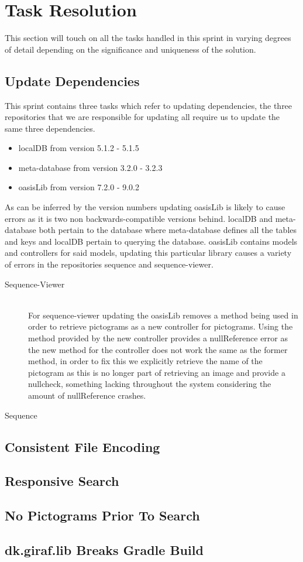 \section{Task Resolution}
This section will touch on all the tasks handled in this sprint in varying degrees of detail depending on the significance and uniqueness of the solution.

\subsection{Update Dependencies}
This sprint contains three tasks which refer to updating dependencies, the three repositories that we are responsible for updating all require us to update the same three dependencies.
\begin{itemize}
    \item localDB from version 5.1.2 - 5.1.5
    \item meta-database from version 3.2.0 - 3.2.3
    \item oasisLib from version 7.2.0 - 9.0.2
\end{itemize}
As can be inferred by the version numbers updating oasisLib is likely to cause errors as it is two non backwards-compatible versions behind.
localDB and meta-database both pertain to the database where meta-database defines all the tables and keys and localDB pertain to querying the database. 
oasisLib contains models and controllers for said models, updating this particular library causes a variety of errors in the repositories sequence and sequence-viewer.
\begin{description}
    \item[Sequence-Viewer] \hfill \\
    For sequence-viewer updating the oasisLib removes a method being used in order to retrieve pictograms as a new controller for pictograms.
    Using the method provided by the new controller provides a nullReference error as the new method for the controller does not work the same as the former method, in order to fix this we explicitly retrieve the name of the pictogram as this is no longer part of retrieving an image and provide a nullcheck, something lacking throughout the system considering the amount of nullReference crashes.
    \item[Sequence] 
\end{description}

\subsection{Consistent File Encoding}
\subsection{Responsive Search}
\subsection{No Pictograms Prior To Search}
\subsection{dk.giraf.lib Breaks Gradle Build}
